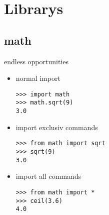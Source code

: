 \documentclass[handout]{beamer}
\begin{document}
\section{Librarys}
    \subsection{math}
		\begin{frame}[fragile]{endless opportunities}
			\begin{itemize}
                \item<1-> normal import
                \begin{lstlisting}
>>> import math
>>> math.sqrt(9)
3.0
\end{lstlisting}
                \item<2-> import exclusiv commands
                \begin{lstlisting}
>>> from math import sqrt
>>> sqrt(9)
3.0
\end{lstlisting}
                \item<3-> import all commands
                \begin{lstlisting}
>>> from math import *
>>> ceil(3.6)
4.0
\end{lstlisting}
            \end{itemize}
		\end{frame}
        
        
\end{document}

